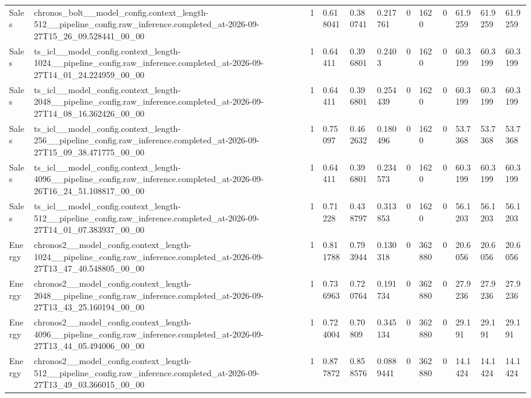 \begin{tabular}{llllllllllll}
Sales & chronos\_bolt\_\_model\_config.context\_length-512\_\_pipeline\_config.raw\_inference.completed\_at-2026-09-27T15\_26\_09.528441\_00\_00 & 1 & 0.618041 & 0.380741 & 0.217761 & 0 & 1620 & 0 & 61.9259 & 61.9259 & 61.9259 \\
Sales & ts\_icl\_\_model\_config.context\_length-1024\_\_pipeline\_config.raw\_inference.completed\_at-2026-09-27T14\_01\_24.224959\_00\_00 & 1 & 0.64411 & 0.396801 & 0.2403 & 0 & 1620 & 0 & 60.3199 & 60.3199 & 60.3199 \\
Sales & ts\_icl\_\_model\_config.context\_length-2048\_\_pipeline\_config.raw\_inference.completed\_at-2026-09-27T14\_08\_16.362426\_00\_00 & 1 & 0.64411 & 0.396801 & 0.254439 & 0 & 1620 & 0 & 60.3199 & 60.3199 & 60.3199 \\
Sales & ts\_icl\_\_model\_config.context\_length-256\_\_pipeline\_config.raw\_inference.completed\_at-2026-09-27T15\_09\_38.471775\_00\_00 & 1 & 0.75097 & 0.462632 & 0.180496 & 0 & 1620 & 0 & 53.7368 & 53.7368 & 53.7368 \\
Sales & ts\_icl\_\_model\_config.context\_length-4096\_\_pipeline\_config.raw\_inference.completed\_at-2026-09-26T16\_24\_51.108817\_00\_00 & 1 & 0.64411 & 0.396801 & 0.234573 & 0 & 1620 & 0 & 60.3199 & 60.3199 & 60.3199 \\
Sales & ts\_icl\_\_model\_config.context\_length-512\_\_pipeline\_config.raw\_inference.completed\_at-2026-09-27T14\_01\_07.383937\_00\_00 & 1 & 0.71228 & 0.438797 & 0.313853 & 0 & 1620 & 0 & 56.1203 & 56.1203 & 56.1203 \\
Energy & chronos2\_\_model\_config.context\_length-1024\_\_pipeline\_config.raw\_inference.completed\_at-2026-09-27T13\_47\_40.548805\_00\_00 & 1 & 0.811788 & 0.793944 & 0.130318 & 0 & 362880 & 0 & 20.6056 & 20.6056 & 20.6056 \\
Energy & chronos2\_\_model\_config.context\_length-2048\_\_pipeline\_config.raw\_inference.completed\_at-2026-09-27T13\_43\_25.160194\_00\_00 & 1 & 0.736963 & 0.720764 & 0.191734 & 0 & 362880 & 0 & 27.9236 & 27.9236 & 27.9236 \\
Energy & chronos2\_\_model\_config.context\_length-4096\_\_pipeline\_config.raw\_inference.completed\_at-2026-09-27T13\_44\_05.494006\_00\_00 & 1 & 0.724004 & 0.70809 & 0.345134 & 0 & 362880 & 0 & 29.191 & 29.191 & 29.191 \\
Energy & chronos2\_\_model\_config.context\_length-512\_\_pipeline\_config.raw\_inference.completed\_at-2026-09-27T13\_49\_03.366015\_00\_00 & 1 & 0.877872 & 0.858576 & 0.0889441 & 0 & 362880 & 0 & 14.1424 & 14.1424 & 14.1424 \\

\end{tabular}
